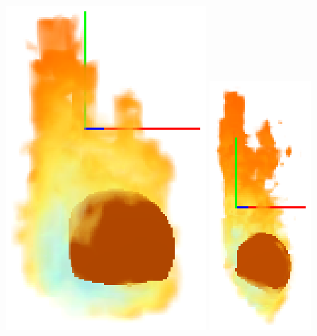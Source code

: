 \documentclass[a4paper,10pt]{article}
\begin{document}
\begin{center}
	\includegraphics[scale=0.6]{Decomposition0.ps}
	\includegraphics[scale=0.8]{Decomposition2.ps}

\end{center}
\end{document}
